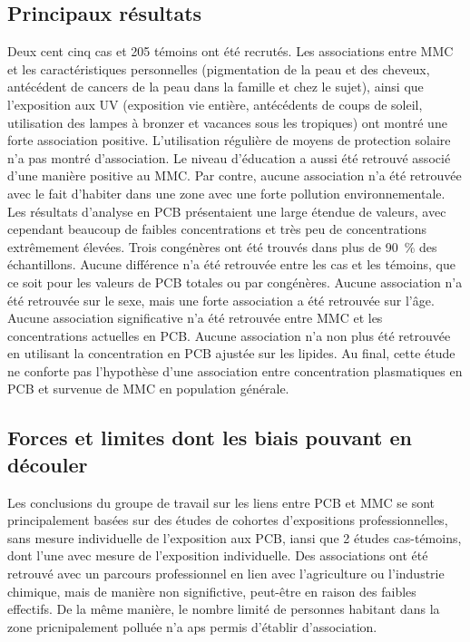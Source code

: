 \documentclass[10pt]{article}
\begin{document}
\subsection{Principaux résultats}
Deux cent cinq cas et 205 témoins ont été recrutés. Les associations entre MMC et les caractéristiques personnelles (pigmentation de la peau et des cheveux, antécédent de cancers de la peau dans la famille et chez le sujet), ainsi que l'exposition aux UV (exposition vie entière, antécédents de coups de soleil, utilisation des lampes à bronzer et vacances sous les tropiques) ont montré une forte association positive. L'utilisation régulière de moyens de protection solaire n'a pas montré d'association. Le niveau d'éducation a aussi été retrouvé associé d'une manière positive au MMC. Par contre, aucune association n'a été retrouvée avec le fait d'habiter dans une zone avec une forte pollution environnementale. Les résultats d'analyse en PCB présentaient une large étendue de valeurs, avec cependant beaucoup de faibles concentrations et très peu de concentrations extrêmement élevées. Trois congénères ont été trouvés dans plus de 90~\% des échantillons. Aucune différence n'a été retrouvée entre les cas et les témoins, que ce soit pour les valeurs de PCB totales ou par congénères. Aucune association n'a été retrouvée sur le sexe, mais une forte association a été retrouvée sur l'âge. Aucune association significative n'a été retrouvée entre MMC et les concentrations actuelles en PCB. Aucune association n'a non plus été retrouvée en utilisant la concentration en PCB ajustée sur les lipides. Au final, cette étude ne conforte pas l'hypothèse d'une association entre concentration plasmatiques en PCB et survenue de MMC en population générale.

\subsection{Forces et limites dont les biais pouvant en découler}
Les conclusions du groupe de travail sur les liens entre PCB et MMC se sont principalement basées sur des études de cohortes d'expositions professionnelles, sans mesure individuelle de l'exposition aux PCB, iansi que 2 études cas-témoins, dont l'une avec mesure de l'exposition individuelle. Des associations ont été retrouvé avec un parcours professionnel en lien avec l'agriculture ou l'industrie chimique, mais de manière non significtive, peut-être en raison des faibles effectifs. De la même manière, le nombre limité de personnes habitant dans la zone pricnipalement polluée n'a aps permis d'établir d'association.
\end{document}
